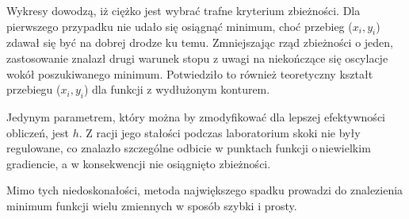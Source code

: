 Wykresy dowodzą, iż ciężko jest wybrać trafne kryterium zbieżności. Dla pierwszego przypadku nie udało się osiągnąć minimum, choć przebieg ($x_i, y_i$) zdawał się być na dobrej drodze ku temu. Zmniejszając rząd zbieżności o jeden, zastosowanie znalazł drugi warunek stopu z uwagi na niekończące się oscylacje wokół poszukiwanego minimum. Potwiedziło to również teoretyczny kształt przebiegu ($x_i, y_i$) dla funkcji z wydłużonym konturem.

Jedynym parametrem, który można by zmodyfikować dla lepszej efektywności obliczeń, jest $h$. Z racji jego stałości podczas laboratorium skoki nie były regulowane, co znalazło szczególne odbicie w punktach funkcji o\,niewielkim gradiencie, a w konsekwencji nie osiągnięto zbieżności.

Mimo tych niedoskonałości, metoda największego spadku prowadzi do znalezienia minimum funkcji wielu zmiennych w sposób szybki i prosty.

